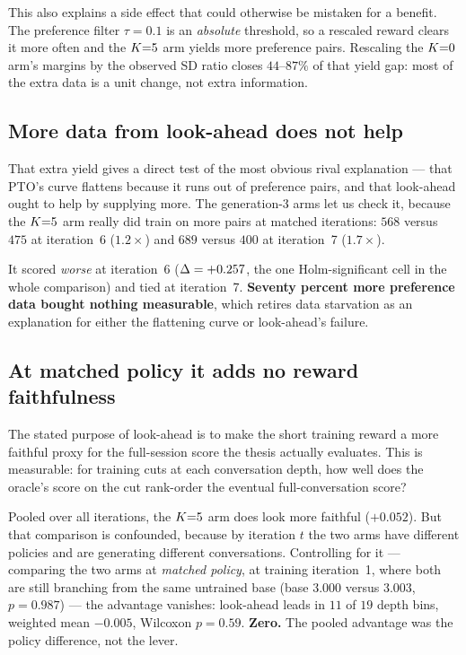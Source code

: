This also explains a side effect that could otherwise be mistaken for a benefit. The
preference filter $\tau = 0.1$ is an \emph{absolute} threshold, so a rescaled reward clears it
more often and the $K{=}5$ arm yields more preference pairs. Rescaling the $K{=}0$ arm's
margins by the observed SD ratio closes $44$--$87\%$ of that yield gap: most of the extra data
is a unit change, not extra information.

\subsection{More data from look-ahead does not help}
\label{sec:starvation}
That extra yield gives a direct test of the most obvious rival explanation --- that PTO's curve
flattens because it runs out of preference pairs, and that look-ahead ought to help by
supplying more. The generation-3 arms let us check it, because the $K{=}5$ arm really did
train on more pairs at matched iterations: $568$ versus $475$ at iteration~6 ($1.2\times$) and
$689$ versus $400$ at iteration~7 ($1.7\times$).

It scored \emph{worse} at iteration~6 ($\Delta = +0.257$, the one Holm-significant cell in the
whole comparison) and tied at iteration~7. \textbf{Seventy percent more preference data bought
nothing measurable}, which retires data starvation as an explanation for either the flattening
curve or look-ahead's failure.

\subsection{At matched policy it adds no reward faithfulness}
\label{sec:faithfulness}
The stated purpose of look-ahead is to make the short training reward a more faithful proxy for
the full-session score the thesis actually evaluates. This is measurable: for training cuts at
each conversation depth, how well does the oracle's score on the cut rank-order the eventual
full-conversation score?

Pooled over all iterations, the $K{=}5$ arm does look more faithful ($+0.052$). But that
comparison is confounded, because by iteration $t$ the two arms have different policies and are
generating different conversations. Controlling for it --- comparing the two arms at
\emph{matched policy}, at training iteration~1, where both are still branching from the same
untrained base (base \QQ{} $3.000$ versus $3.003$, $p = 0.987$) --- the advantage vanishes:
look-ahead leads in $11$ of $19$ depth bins, weighted mean $-0.005$, Wilcoxon $p = 0.59$.
\textbf{Zero.} The pooled advantage was the policy difference, not the lever.

